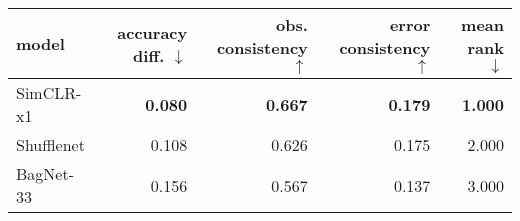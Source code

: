 \begin{tabular}{lrrrr}
\toprule
     model & accuracy diff. $\downarrow$ & obs. consistency $\uparrow$ & error consistency $\uparrow$ & mean rank $\downarrow$ \\
\midrule
 SimCLR-x1 &              \textbf{0.080} &              \textbf{0.667} &               \textbf{0.179} &         \textbf{1.000} \\
Shufflenet &                       0.108 &                       0.626 &                        0.175 &                  2.000 \\
 BagNet-33 &                       0.156 &                       0.567 &                        0.137 &                  3.000 \\
\bottomrule
\end{tabular}

